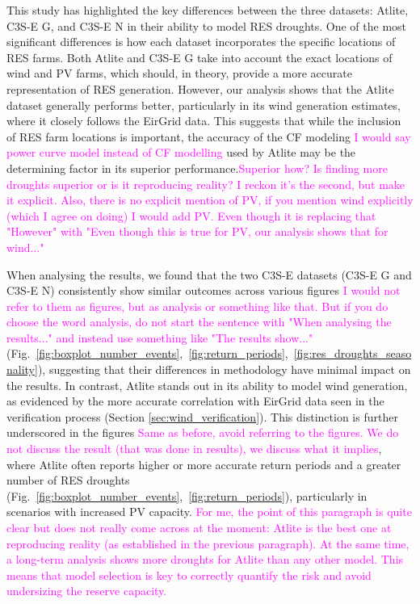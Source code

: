 \documentclass[a4paper, 11pt]{article}
\begin{document}
This study has highlighted the key differences between the three datasets: Atlite, C3S-E G, and C3S-E N in their ability to model RES droughts. One of the most significant differences is how each dataset incorporates the specific locations of RES farms. Both Atlite and C3S-E G take into account the exact locations of wind and PV farms, which should, in theory, provide a more accurate representation of RES generation. However, our analysis shows that the Atlite dataset generally performs better, particularly in its wind generation estimates, where it closely follows the EirGrid data. This suggests that while the inclusion of RES farm locations is important, the accuracy of the CF modeling \textcolor{magenta}{I would say power curve model instead of CF modelling} used by Atlite may be the determining factor in its superior performance.\textcolor{magenta}{Superior how? Is finding more droughts superior or is it reproducing reality? I reckon it's the second, but make it explicit. Also, there is no explicit mention of PV, if you mention wind explicitly (which I agree on doing) I would add PV. Even though it is replacing that "However" with "Even though this is true for PV, our analysis shows that for wind..."}

When analysing the results, we found that the two C3S-E datasets (C3S-E G and C3S-E N) consistently show similar outcomes across various figures \textcolor{magenta}{I would not refer to them as figures, but as analysis or something like that. But if you do choose the word analysis, do not start the sentence with "When analysing the results..." and instead use something like "The results show..."} (Fig.~\ref{fig:boxplot_number_events},~\ref{fig:return_periods},~\ref{fig:res_droughts_seasonality}), suggesting that their differences in methodology have minimal impact on the results. In contrast, Atlite stands out in its ability to model wind generation, as evidenced by the more accurate correlation with EirGrid data seen in the verification process (Section \ref{sec:wind_verification}). This distinction is further underscored in the figures \textcolor{magenta}{Same as before, avoid referring to the figures. We do not discuss the result (that was done in results), we discuss what it implies}, where Atlite often reports higher or more accurate return periods and a greater number of RES droughts (Fig.~\ref{fig:boxplot_number_events},~\ref{fig:return_periods}), particularly in scenarios with increased PV capacity. \textcolor{magenta}{For me, the point of this paragraph is quite clear but does not really come across at the moment: Atlite is the best one at reproducing reality (as established in the previous paragraph). At the same time, a long-term analysis shows more droughts for Atlite than any other model. This means that model selection is key to correctly quantify the risk and avoid undersizing the reserve capacity.}
\end{document}
